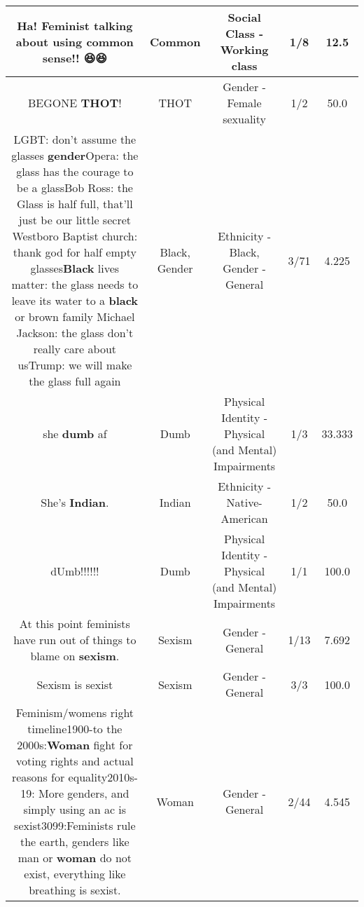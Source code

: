\documentclass[11pt]{article}
\newlength\mylength
\begin{document}
\begin{center}
\begin{longtable}{|C{.65\mylength}|C{.30\mylength}|C{.12\mylength}|C{.12\mylength}|C{.12\mylength}|}
  \small Ha! Feminist talking about using \textbf{common} sense!! 😆😆\normalsize   & Common & Social Class - Working class & 1/8 & 12.5 \\  \hline
  \small BEGONE \textbf{THOT}!\normalsize   & THOT & Gender - Female sexuality & 1/2 & 50.0 \\  \hline
  \small LGBT: don't assume the glasses \textbf{gender}Opera: the glass has the courage to be a glassBob Ross: the Glass is half full, that'll just be our little secret Westboro Baptist church: thank god for half empty glasses\textbf{Black} lives matter: the glass needs to leave its water to a \textbf{black} or brown family Michael Jackson: the glass don't really care about usTrump: we will make the glass full again\normalsize   & Black, Gender & Ethnicity - Black, Gender - General & 3/71 & 4.225 \\  \hline
  \small she \textbf{dumb} af\normalsize   & Dumb & Physical Identity - Physical (and Mental) Impairments & 1/3 & 33.333 \\  \hline
  \small She's \textbf{Indian}.\normalsize   & Indian & Ethnicity - Native-American & 1/2 & 50.0 \\  \hline
  \small dUmb!!!!!!\normalsize   & Dumb & Physical Identity - Physical (and Mental) Impairments & 1/1 & 100.0 \\  \hline
  \small At this point feminists have run out of things to blame on \textbf{sexism}.\normalsize   & Sexism & Gender - General & 1/13 & 7.692 \\  \hline
  \small Sexism is sexist\normalsize   & Sexism & Gender - General & 3/3 & 100.0 \\  \hline
  \small Feminism/womens right timeline1900-to the 2000s:\textbf{Woman} fight for voting rights and actual reasons for equality2010s-19: More genders, and simply using an ac is sexist3099:Feminists rule the earth, genders like man or \textbf{woman} do not exist, everything like breathing is sexist.\normalsize   & Woman & Gender - General & 2/44 & 4.545 \\  \hline

\end{longtable}
\end{center}
\end{document}
